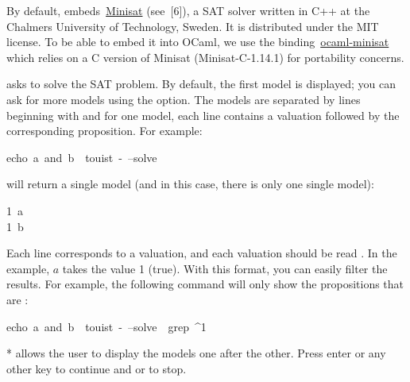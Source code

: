 \noindent By default,  embeds~\href{http://minisat.se}{Minisat}
(see~[\cite{sorensson02minisatv1_13}{6}]), a SAT solver written in C++ at the
Chalmers University of Technology, Sweden. It is distributed under the
MIT license. To be able to embed it into OCaml, we use the
binding~\href{https://github.com/c-cube/ocaml-minisat}{ocaml-minisat} which relies on a C version of Minisat
(Minisat-C-1.14.1) for portability concerns.%

\textbf{} asks  to solve the SAT problem. By default, the first
model is displayed; you can ask for more models using the 
option. The models are separated by lines beginning with \mdcode{====} and for
one model, each line contains a valuation followed by the corresponding
proposition. For example:%
\begin{mdpre}%
\noindent{}echo~a~and~b~\textbar{}~touist~-~--solve%
\end{mdpre}\noindent will return a single model (and in this case, there is only one single model):
\begin{mdpre}%
\noindent{}1~a\\
1~b%
\end{mdpre}\noindent Each line corresponds to a valuation, and each valuation should be read
. In the example, $a$ takes the value 1 (true).
With this format, you can easily filter the results. For example,
the following command will only show the propositions that are :
\begin{mdpre}%
\noindent{}echo~a~and~b~\textbar{}~touist~-~--solve~\textbar{}~grep~\textasciicircum{}1%
\end{mdpre}\noindent** allows the user to display the models one after
the other. Press enter or any other key to continue and  or  to stop.

